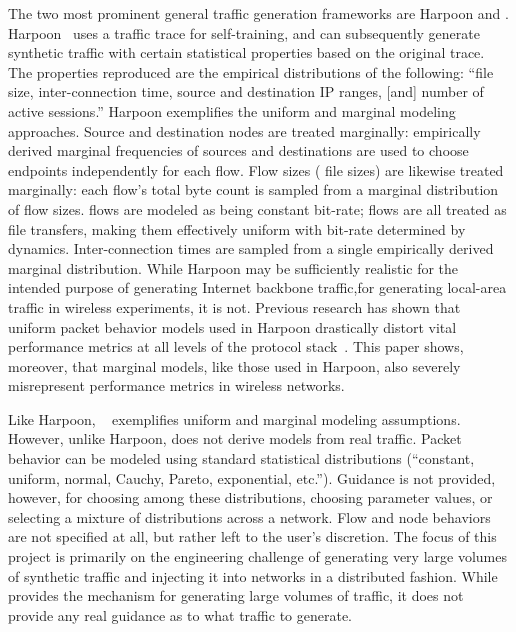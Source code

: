\documentclass[twocolumn,final]{svjour3}
\begin{document}
The two most prominent general traffic generation frameworks are Harpoon and . Harpoon~\cite{Sommers04} uses a traffic trace for self-training, and can subsequently generate synthetic traffic with certain statistical properties based on the original trace.
The properties reproduced are the empirical distributions of the following: ``file size, inter-connection time, source and destination IP ranges, [and] number of active sessions.''
Harpoon exemplifies the uniform and marginal modeling approaches.
Source and destination nodes are treated marginally: empirically derived marginal frequencies of sources and destinations are used to choose endpoints independently for each flow.
Flow sizes ( file sizes) are likewise treated marginally: each flow's total byte  count is sampled from a marginal distribution of flow sizes.
 flows are modeled as being constant bit-rate;
 flows are all treated as file transfers, making them effectively uniform with bit-rate determined by  dynamics.
Inter-connection times are sampled from a single empirically derived marginal distribution.
While Harpoon may be sufficiently realistic for the intended purpose of generating Internet backbone traffic,\harpoonnote for generating local-area traffic in wireless experiments, it is not.
Previous research has shown that uniform packet behavior models used in Harpoon drastically distort vital performance metrics at all levels of the protocol stack~\cite{Karpinski07:cbr-failure}.
This paper shows, moreover, that marginal models, like those used in Harpoon, also severely misrepresent performance metrics in wireless networks.

Like Harpoon, ~\cite{Avallone04} exemplifies uniform and marginal modeling assumptions. However, unlike Harpoon,  does not derive models from real traffic.
Packet behavior can be modeled using standard statistical distributions (``constant, uniform, normal, Cauchy, Pareto, exponential, etc.'').
Guidance is not provided, however, for choosing among these distributions, choosing parameter values, or selecting a mixture of distributions across a network.
Flow and node behaviors are not specified at all, but rather left to the user's discretion.
The focus of this project is primarily on the engineering challenge of generating very large volumes of synthetic traffic and injecting it into networks in a distributed fashion.
While  provides the mechanism for generating large volumes of traffic, it does not provide any real guidance as to what traffic to generate.
\end{document}
